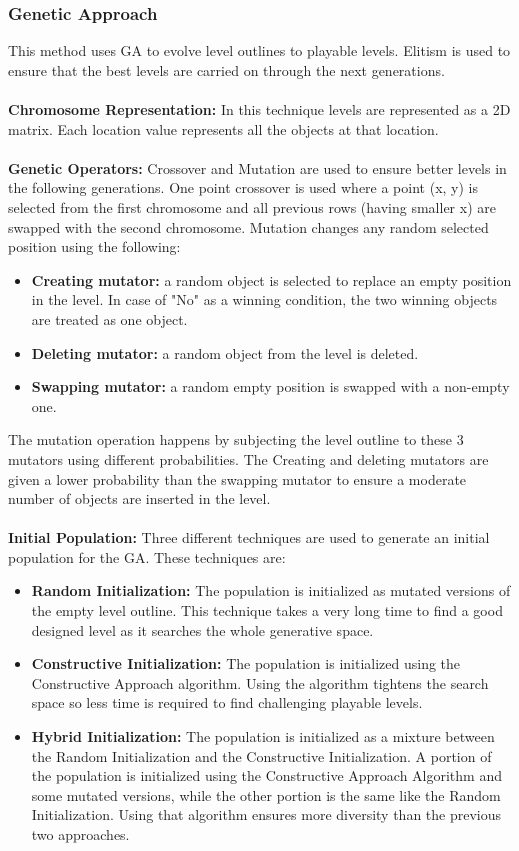 \subsubsection{Genetic Approach}
This method uses GA to evolve level outlines to playable levels. Elitism is used to ensure that the best levels are carried on through the next generations.\\\\
\textbf{Chromosome Representation:} In this technique levels are represented as a 2D matrix. Each location value represents all the objects at that location.\\\\
\textbf{Genetic Operators:} Crossover and Mutation are used to ensure better levels in the following generations. One point crossover is used where a point (x, y) is selected from the first chromosome and all previous rows (having smaller x) are swapped with the second chromosome. Mutation changes any random selected position using the following:
\begin{itemize} \itemsep0pt \parskip0pt 
	\item \textbf{Creating mutator:} a random object is selected to replace an empty position in the level. In case of "No" as a winning condition, the two winning objects are treated as one object.
	\item \textbf{Deleting mutator:} a random object from the level is deleted.
	\item \textbf{Swapping mutator:} a random empty position is swapped with a non-empty one.
\end{itemize}
The mutation operation happens by subjecting the level outline to these 3 mutators using different probabilities. The Creating and deleting mutators are given a lower probability than the swapping mutator to ensure a moderate number of objects are inserted in the level.\\\\
\textbf{Initial Population:} Three different techniques are used to generate an initial population for the GA. These techniques are:
\begin{itemize} \itemsep0pt \parskip0pt 
	\item \textbf{Random Initialization:} The population is initialized as mutated versions of the empty level outline. This technique takes a very long time to find a good designed level as it searches the whole generative space.
	\item \textbf{Constructive Initialization:} The population is initialized using the Constructive Approach algorithm. Using the algorithm tightens the search space so less time is required to find challenging playable levels.
	\item \textbf{Hybrid Initialization:} The population is initialized as a mixture between the Random Initialization and the Constructive Initialization. A portion of the population is initialized using the Constructive Approach Algorithm and some mutated versions, while the other portion is the same like the Random Initialization. Using that algorithm ensures more diversity than the previous two approaches.
\end{itemize}
